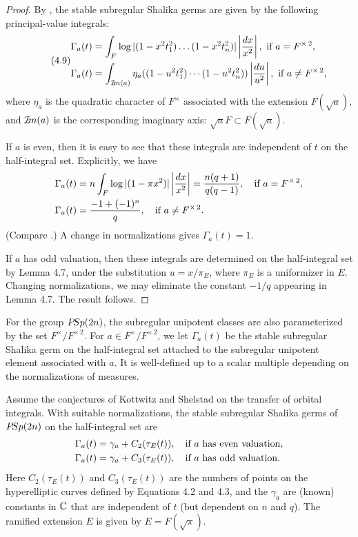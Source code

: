 \documentclass{amsart}
\begin{document}
\begin{proof}  By \cite{H5,1.2}, the stable subregular Shalika germs are given by
the following principal-value integrals:
\begin{equation}
\tag{4.9}
\begin{aligned}
\Gamma_a(t) &= \int_{F} \log|(1-x^2 t_1^2)\ldots
(1-x^2 t_n^2)|\left| {dx\over x^2}\right|,\ \hbox{if } a=F^{\times\,2},\\
\Gamma_a(t) &= \int_{{\mathcal I\hskip-.2em m}(a)}
        \eta_a((1-u^2 t_1^2)\cdots (1-u^2 t_n^2))\left| {du\over u^2}\right|,
        \ \hbox{if } a\ne F^{\times\,2},
\end{aligned}
\end{equation}
where $\eta_a$ is the quadratic character of $F^\times$
associated with  the extension $F(\sqrt{a})$, and ${\mathcal I\hskip-.2em m}(a)$ is the
corresponding imaginary axis: $\sqrt{a}F \subset F(\sqrt{a})$.

If $a$ is even, then it is easy to see that these integrals are
independent of $t$ on the half-integral set.  
Explicitly, we have
\begin{align*}
\Gamma_a(t) &= n\int_F \log|(1-\pi x^2)| \left|{dx\over x^2}\right|=
 {n (q+1)\over q (q-1)}, \quad \hbox{if } a=F^{\times\,2},\\
\Gamma_a(t) &= {-1+(-1)^n\over q}, \quad \hbox{if } a\ne F^{\times\,2}.
\end{align*}
(Compare \cite{H5,2.8}.)  A change in normalizations gives 
$\Gamma_a(t)=1$.

If $a$ has odd valuation, then these integrals are determined on
the half-integral set by Lemma 4.7, under the substitution
$u=x/\pi_E $, where $\pi_E$ is a uniformizer in $E$.  Changing
normalizations, we may eliminate the constant $-1/q$ appearing
in Lemma 4.7.
The result follows. \end{proof}

\bigskip
For the group ${P\! Sp}(2n)$, the subregular unipotent classes are also
parameterized by the set $F^\times/F^{\times\,2}$.  For $a\in F^\times/
F^{\times\,2}$, we let $\Gamma_a(t)$ be the stable
subregular Shalika germ on the half-integral set 
attached to the
subregular unipotent element associated with $a$.  It is well-defined
up to a scalar multiple depending on the normalizations of measures.

  Assume the conjectures of Kottwitz and Shelstad
on the transfer of orbital integrals.  With suitable normalizations,
the stable subregular Shalika germs of ${P\! Sp}(2n)$ on the half-integral
set are
\begin{align*}
\Gamma_a(t) &= \gamma_a +  C_2(\tau_E(t)),\quad
\hbox{if $a$ has even valuation,}\\
\Gamma_a(t) &= \gamma_a +  C_3(\tau_E(t)),\quad
\hbox{if $a$ has odd valuation.}
\end{align*}
Here $C_2(\tau_E(t))$ and $C_3(\tau_E(t))$ are the numbers of points
on the hyperelliptic curves defined by Equations 4.2 and 4.3,
and the $\gamma_a$ are (known) constants in ${\Bbb C}$
that are independent of $t$ (but dependent on $n$ and $q$).
  The ramified extension
$E$ is given by $E=F(\sqrt{\pi})$.
\endproclaim
\end{document}
